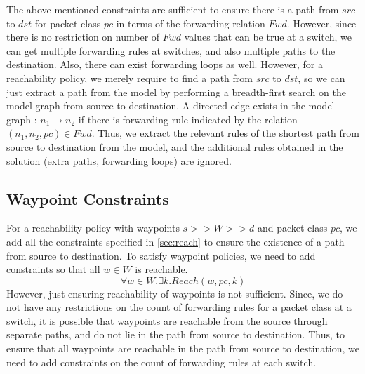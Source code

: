 The above mentioned constraints are sufficient to ensure there is a path from $src$ to $dst$ for packet class $pc$ in terms of the forwarding relation $Fwd$. However, since there is no restriction on number of $Fwd$ values that can be true at a switch, we can get multiple forwarding rules at switches, and also multiple paths to the destination. Also, there can exist forwarding loops as well. However, for a reachability policy, we merely require to find a path from $src$ to $dst$, so we can just extract a path from the model by performing a breadth-first search on the model-graph from source to destination. 
 
A directed edge exists in the model-graph : $n_1 \rightarrow n_2$ if there is forwarding rule indicated by the relation $(n_1,n_2, pc) \in Fwd$. Thus, we extract the relevant rules of the shortest path from source to destination from the model, and the additional rules obtained in the solution (extra paths, forwarding loops) are ignored.  
\subsection{Waypoint Constraints} 
For a reachability policy with waypoints $s >> W >> d$ and packet class $pc$, we add all the constraints specified in \cref{sec:reach} to ensure the existence of a path from source to destination. To satisfy waypoint policies, we need to add constraints so that all $w \in W$ is reachable. 
\begin{equation} \label{eq:waypoints}
	\forall w \in W. \exists k. Reach(w, pc, k)
\end{equation}
However, just ensuring reachability of waypoints is not sufficient. Since, we do not have any restrictions on the count of forwarding rules for a packet class at a switch, it is possible that waypoints are reachable from the source through separate paths, and do not lie in the path from source to destination. Thus, to ensure that all waypoints are reachable in the path from source to destination, we need to add constraints on the count of forwarding rules at each switch. 

